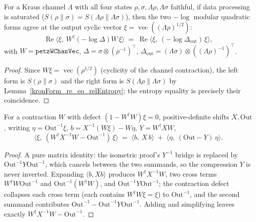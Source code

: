 \begin{theorem}\label{channel_modular_gap}
  \leanok
  For a Kraus channel \(\Lambda\) with all four states \(\rho,\sigma,\Lambda\rho,\Lambda\sigma\)
  faithful, if data processing is saturated (\(S(\rho\|\sigma)=S(\Lambda\rho\|\Lambda\sigma)\)), then
  the two \(-\log\) modular quadratic forms agree at the output cyclic vector
  \(\xi=\operatorname{vec}((\Lambda\rho)^{1/2})\):
  \[
    \operatorname{Re}\bigl\langle\xi,\ W^{\dagger}(-\log\Delta)W\,\xi\bigr\rangle
      \;=\; \operatorname{Re}\bigl\langle\xi,\ (-\log\Delta_{\mathrm{out}})\,\xi\bigr\rangle,
  \]
  with \(W=\texttt{petzWChanVec}\), \(\Delta=\sigma\otimes(\rho^{-1})^{\top}\),
  \(\Delta_{\mathrm{out}}=(\Lambda\sigma)\otimes((\Lambda\rho)^{-1})^{\top}\).
\end{theorem}
\begin{proof}\leanok
  Since \(W\xi=\operatorname{vec}(\rho^{1/2})\) (cyclicity of the channel contraction), the left form
  is \(S(\rho\|\sigma)\) and the right form is \(S(\Lambda\rho\|\Lambda\sigma)\) by
  Lemma~\ref{kronForm_re_eq_relEntropy}; the entropy equality is precisely their coincidence.
\end{proof}

\begin{lemma}\label{contraction_gap_decomp}
  \leanok
  For a contraction \(W\) with defect \((1-W^{\dagger}W)\xi=0\), positive-definite shifts
  \(X,\mathrm{Out}\), writing \(\eta=\mathrm{Out}^{-1}\xi\), \(b=X^{-1}(W\xi)-W\eta\),
  \(Y=W^{\dagger}XW\),
  \[
    \bigl\langle\xi,\ (W^{\dagger}X^{-1}W-\mathrm{Out}^{-1})\,\xi\bigr\rangle
      \;=\; \langle b,\ X\,b\rangle \;+\; \langle\eta,\ (\mathrm{Out}-Y)\,\eta\rangle .
  \]
\end{lemma}
\begin{proof}\leanok
  A pure matrix identity: the isometric proof's \(Y^{-1}\) bridge is replaced by
  \(\mathrm{Out}^{-1}Y\mathrm{Out}^{-1}\), which cancels between the two summands, so the compression
  \(Y\) is never inverted. Expanding \(\langle b,Xb\rangle\) produces \(W^{\dagger}X^{-1}W\), two
  cross terms \(W^{\dagger}W\mathrm{Out}^{-1}\) and \(\mathrm{Out}^{-1}(W^{\dagger}W)\), and
  \(\mathrm{Out}^{-1}Y\mathrm{Out}^{-1}\); the contraction defect collapses each cross term (each
  contains \(W^{\dagger}W\xi=\xi\)) to \(\mathrm{Out}^{-1}\), and the second summand contributes
  \(\mathrm{Out}^{-1}-\mathrm{Out}^{-1}Y\mathrm{Out}^{-1}\). Adding and simplifying leaves exactly
  \(W^{\dagger}X^{-1}W-\mathrm{Out}^{-1}\).
\end{proof}

